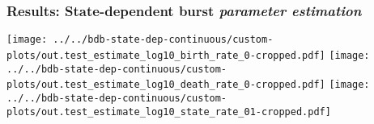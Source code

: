 \begin{frame}[t]
    \frametitle{Results: State-dependent burst \textbf{\textit{parameter estimation}}}

    \vspace{-3.5mm}
    \begin{center}

                \texttt{[image: ../../bdb-state-dep-continuous/custom-plots/out.test\_estimate\_log10\_birth\_rate\_0-cropped.pdf]}
                \hspace{3mm}
                \texttt{[image: ../../bdb-state-dep-continuous/custom-plots/out.test\_estimate\_log10\_death\_rate\_0-cropped.pdf]}
                \hspace{3mm}
                \texttt{[image: ../../bdb-state-dep-continuous/custom-plots/out.test\_estimate\_log10\_state\_rate\_01-cropped.pdf]}
    \end{center}

\end{frame}
